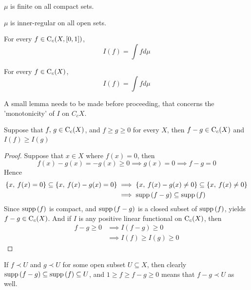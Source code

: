 \documentclass[../../main.tex]{subfiles}
\begin{document}
\begin{enumalpha}
    \label{7.2.h}
%
%
    \item $\mu$ is finite on all compact sets.
    \label{7.2.i}
%
%
    \item $\mu$ is inner-regular on all open sets.
    \label{7.2.j}
%
%
    \item For every $f\in\operatorname{C}_c({X,[0,1]})$, 
    \begin{equation}\label{integral equation}
        I(f) = \int fd\mu
    \end{equation}
    \label{7.2.k}
%
%
    \item For every $f\in\operatorname{C}_c({X})$,
    \begin{equation}\label{integral equation general}
        I(f) = \int fd\mu
    \end{equation}
\end{enumalpha}

A small lemma needs to be made before proceeding, that concerns the 'monotonicity' of $I$ on $C_c{X}$.
    \begin{lemma}\label{lemma I is monotonic}
        Suppose that $f,\, g\in\operatorname{C}_c({X})$, and $f\geq g\geq 0$ for every $X$, then $f-g\in\operatorname{C}_c({X})$ and $I(f)\geq I(g)$
    \end{lemma}
    \begin{proof}
        Suppose that $x\in X$ where $f(x) = 0$, then
        \[
        f(x)-g(x) = -g(x)\geq 0\implies g(x)=0\implies f-g=0
        \]
        Hence
        \begin{align*}
            \left\{x,\:f(x)=0\right\}\subseteq\left\{x,\:f(x)-g(x)=0\right\}&\implies \left\{x,\:f(x)-g(x)\neq0\right\}\subseteq \left\{x,\:f(x)\neq0\right\}\\
            &\implies \operatorname{supp}{(f-g)}\subseteq \operatorname{supp}{(f)}
        \end{align*}
        Since $\operatorname{supp}{(f)}$ is compact, and $\operatorname{supp}{(f-g)}$ is a closed subset of $\operatorname{supp}{(f)}$, yields $f-g\in\operatorname{C}_c({X})$. And if $I$ is any positive linear functional on $\operatorname{C}_c({X})$, then
        \begin{align*}
            f-g\geq 0&\implies I(f-g)\geq 0\\
            &\implies I(f)\geq I(g)\geq 0
        \end{align*}
    \end{proof}
\remark If $f\prec U$ and $g\prec U$ for some open subset $U\subseteq X$, then clearly $\operatorname{supp}{(f-g)}\subseteq \operatorname{supp}{(f)}\subseteq U$, and $1\geq f\geq f-g\geq 0$ means that $f-g\prec U$ as well.
\end{document}
